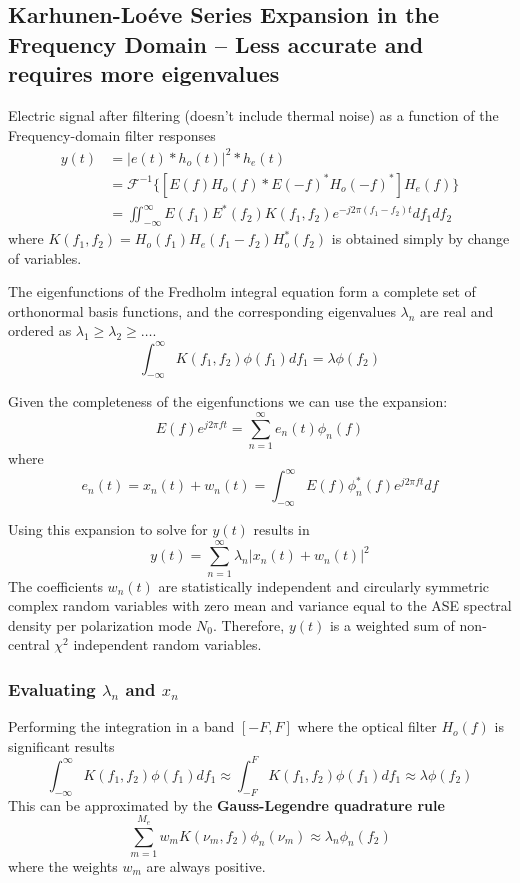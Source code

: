 \documentclass[a4paper]{article}
\begin{document}
\subsection{Karhunen-Loéve Series Expansion in the Frequency Domain -- Less accurate and requires more eigenvalues}
Electric signal after filtering (doesn't include thermal noise) as a function of the Frequency-domain filter responses
\begin{align} \nonumber
y(t) &= |e(t)\ast h_o(t)|^2\ast h_e(t) \\ \nonumber
& = \mathcal{F}^{-1}\{[E(f)H_o(f)\ast E(-f)^*H_o(-f)^*]H_e(f)\} \\
& = \iint_{-\infty}^{\infty} E(f_1)E^*(f_2)K(f_1, f_2)e^{-j2\pi(f_1-f_2)t}df_1df_2
\end{align}
where $K(f_1, f_2) = H_o(f_1)H_e(f_1-f_2)H_o^*(f_2)$ is obtained simply by change of variables.

The eigenfunctions of the Fredholm integral equation form a complete set of orthonormal basis functions, and the corresponding eigenvalues $\lambda_n$ are real and ordered as $\lambda_1 \geq \lambda_2 \geq \ldots$.
\begin{equation}
\int_{-\infty}^{\infty} K(f_1, f_2)\phi(f_1)df_1 = \lambda\phi(f_2)
\end{equation}

Given the completeness of the eigenfunctions we can use the expansion:
\begin{equation}
E(f)e^{j2\pi ft} = \sum_{n=1}^{\infty}e_n(t)\phi_n(f)
\end{equation}
where 
\begin{equation}
e_n(t) = x_n(t) + w_n(t) = \int_{-\infty}^{\infty}E(f)\phi^*_n(f)e^{j2\pi ft}df
\end{equation}

Using this expansion to solve for $y(t)$ results in
\begin{equation}
y(t) = \sum_{n=1}^{\infty}\lambda_n|x_n(t) + w_n(t)|^2
\end{equation}
The coefficients $w_n(t)$ are statistically independent and circularly symmetric complex random variables with zero mean and variance equal to the ASE spectral density per polarization mode $N_0$.
Therefore, $y(t)$ is a weighted sum of non-central $\chi^2$ independent random variables.

\subsubsection{Evaluating $\lambda_n$ and $x_n$}
Performing the integration in a band $[-F, F]$ where the optical filter $H_o(f)$ is significant results
\begin{equation}
\int_{-\infty}^{\infty} K(f_1, f_2)\phi(f_1)df_1 \approx \int_{-F}^{F} K(f_1, f_2)\phi(f_1)df_1 \approx \lambda\phi(f_2)
\end{equation}
This can be approximated by the \textbf{Gauss-Legendre quadrature rule}
\begin{equation}
\sum_{m=1}^{M_e}w_mK(\nu_m, f_2)\phi_n(\nu_m) \approx \lambda_n\phi_n(f_2)
\end{equation}
where the weights $w_m$ are always positive.
\end{document}
